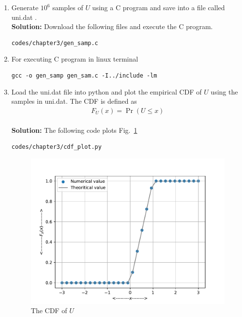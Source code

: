 \documentclass[journal,15pt,twocolumn]{IEEEtran}
\newcommand\figref{Fig.~\ref}
\providecommand{\pr}[1]{\ensuremath{\Pr\left(#1\right)}}
\newcommand{\solution}{\noindent \textbf{Solution: }}
\begin{document}
\begin{enumerate}
\item Generate $10^6$ samples of $U$ using a C program and save into a file called uni.dat .
\label{prob:uni_gen}
\\
\solution Download the following files and execute the  C program.
\begin{lstlisting}
codes/chapter3/gen_samp.c
\end{lstlisting} 
\item For executing C program in linux terminal 
\begin{lstlisting}
gcc -o gen_samp gen_sam.c -I../include -lm
\end{lstlisting}
%
\item
Load the uni.dat file into python and plot the empirical CDF of $U$ using the samples in uni.dat. The CDF is defined as
\begin{align}
F_{U}(x) = \pr{U \le x}
\end{align}
\\
\solution  The following code plots \figref{fig:uni_cdf}
\begin{lstlisting}
codes/chapter3/cdf_plot.py
\end{lstlisting}
\begin{figure}[H]
\centering
\includegraphics[width=\columnwidth]{./figs/chapter3/cdf_plot.pdf}
\caption{The CDF of $U$}
\label{fig:uni_cdf}
\end{figure}


\end{enumerate}
\end{document}
